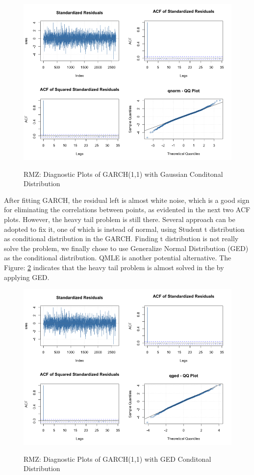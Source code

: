 \documentclass[12pt]{article}
\begin{document}
\begin{figure}
  \caption{RMZ: Diagnostic Plots of GARCH(1,1) with Gaussian Conditonal Distribution}
  \includegraphics[width = \textwidth]{../results/RMZ_GARCH_dig1}
  \label{fig:RMZ_GARCH_dig1}
\end{figure}

After fitting GARCH, the residual left is almost white noise, which is a good sign for eliminating the correlations between points, as evidented in the next two ACF plots. However, the heavy tail problem is still there. Several approach can be adopted to fix it, one of which is instead of normal, using Student t distribution as conditional distribution in the GARCH. Finding t distribution is not really solve the problem, we finally chose to use Generalize Normal Distribution (GED) as the conditional distribution. QMLE is another potential alternative. The Figure: \ref{fig:RMZ_GARCH_dig2} indicates that the heavy tail problem is almost solved in the by applying GED.

\begin{figure}
  \caption{RMZ: Diagnostic Plots of GARCH(1,1) with GED Conditonal Distribution}
  \includegraphics[width = \textwidth]{../results/RMZ_GARCH_dig2}
  \label{fig:RMZ_GARCH_dig2}
\end{figure}
\end{document}
